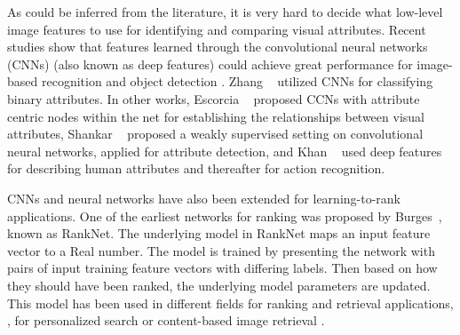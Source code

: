 As could be inferred from the literature, it is very hard to decide what low-level image features to use for identifying and comparing visual attributes. Recent studies show that features learned through the convolutional neural networks (CNNs) \cite{NIPS1989_293} (also known as deep features) could achieve great performance for image-based recognition \cite{NIPS2012_4824} and object detection \cite{6909475}. Zhang \etal~\cite{6909608} utilized CNNs for classifying binary attributes. In other works, Escorcia \etal~\cite{Escorcia_2015_CVPR} proposed CCNs with attribute centric nodes within the net for establishing the relationships between visual attributes, Shankar \etal~\cite{Shankar_2015_CVPR} proposed a weakly supervised setting on convolutional neural networks, applied for attribute detection, and Khan \etal~\cite{khan15} used deep features for describing human attributes and thereafter for action recognition. 

CNNs and neural networks have also been extended for learning-to-rank applications. One of the earliest networks for ranking was proposed by Burges\etal~\cite{Burges2005}, known as RankNet. The underlying model in RankNet maps an input feature vector to a Real number. The model is trained  by presenting the network with pairs of input training feature vectors with differing labels. Then based on how they should have been ranked, the underlying model parameters are updated. This model has been used in different fields for ranking and retrieval applications, \eg, for personalized search \cite{song2014} or content-based image retrieval \cite{Wan2014}. 

